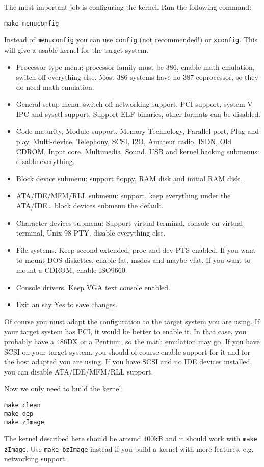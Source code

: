 \documentclass[12pt,a4paper]{article}
\begin{document}
The most important job is configuring the kernel. Run the following
command:
\begin{verbatim}
make menuconfig
\end{verbatim}
Instead of {\tt menuconfig} you can use {\tt config} (not
recommended!) or {\tt xconfig}. This will give a usable kernel for the
target system.
\begin{itemize}
\item Processor type menu: processor family must be 386, enable math
  emulation, switch off everything else. Most 386 systems have no 387
  coprocessor, so they do need math emulation.
\item General setup menu: switch off networking support, PCI support,
  system V IPC
  and sysctl support. Support ELF binaries, other formats can be
  disabled.
\item Code maturity, Module support, Memory Technology, Parallel port,
Plug and play, Multi-device, Telephony, SCSI, I2O, Amateur radio,
ISDN, Old CDROM, Input core, Multimedia, Sound, USB and kernel hacking
submenus: disable everything.
\item Block device submenu: support floppy, RAM disk and initial RAM
  disk.
\item ATA/IDE/MFM/RLL submenu: support, keep everything under the
  ATA/IDE\ldots{} block devices submenu the default.
\item Character devices submenu: Support virtual terminal, console on
  virtual terminal, Unix 98 PTY, disable everything else.
\item File systems. Keep second extended, proc and dev PTS enabled. If
  you want to mount DOS diskettes, enable fat, msdos and maybe
  vfat. If you want to mount a CDROM, enable ISO9660.
\item Console drivers.  Keep VGA text console enabled.
\item Exit an say Yes to save changes.
\end{itemize}
Of course you must adapt the configuration to the target system you
are using. If your target system has PCI, it would be better to
enable it. In that case, you probably have a 486DX or a Pentium, so
the math emulation may go. If you have SCSI on your target system, you
should of course enable support for it and for the host adapted you
are using. If you have SCSI and no IDE devices installed, you can
disable ATA/IDE/MFM/RLL support.

Now we only need to build the kernel:
\begin{verbatim}
make clean
make dep
make zImage
\end{verbatim}
The kernel described here should be around 400kB and it should work
with {\tt make zImage}. Use {\tt make bzImage} instead if you build a
kernel with more features, e.g. networking support.
\end{document}
